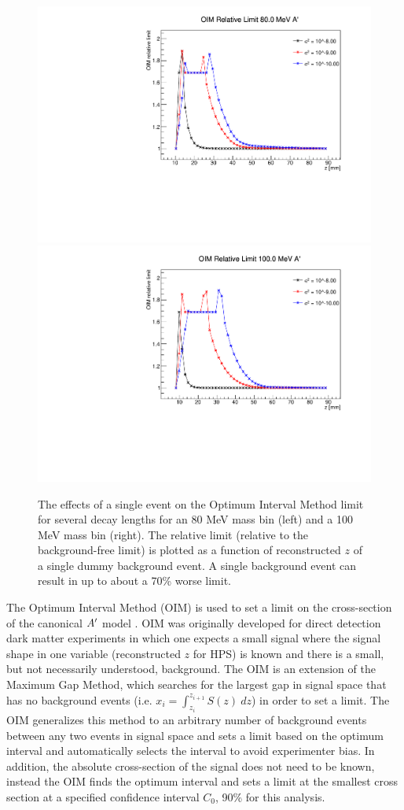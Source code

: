 \begin{figure}[t]
    \centering
    \includegraphics[width=.45\textwidth]{figs/Results/80MeV_dummy.pdf}
    \includegraphics[width=.45\textwidth]{figs/Results/100MeV_dummy.pdf}
    \caption{The effects of a single event on the Optimum Interval Method limit for several decay lengths for an 80 MeV mass bin (left) and a 100 MeV mass bin (right). The relative limit (relative to the background-free limit) is plotted as a function of reconstructed $z$ of a single dummy background event. A single background event can result in up to about a 70\% worse limit.}
    \label{fig:OIM_dummy}
\end{figure}

The Optimum Interval Method (OIM) is used to set a limit on the cross-section of the canonical $A^\prime$ model \cite{PhysRevD.66.032005}. OIM was originally developed for direct detection dark matter experiments in which one expects a small signal where the signal shape in one variable (reconstructed $z$ for HPS) is known and there is a small, but not necessarily understood, background. The OIM is an extension of the Maximum Gap Method, which searches for the largest gap in signal space that has no background events (i.e. $x_i=\int_{z_i}^{z_{i+1}}S(z) \ dz$) in order to set a limit. The OIM generalizes this method to an arbitrary number of background events between any two events in signal space and sets a limit based on the optimum interval and automatically selects the interval to avoid experimenter bias. In addition, the absolute cross-section of the signal does not need to be known, instead the OIM finds the optimum interval and sets a limit at the smallest cross section at a specified confidence interval $C_0$, 90\% for this analysis.

